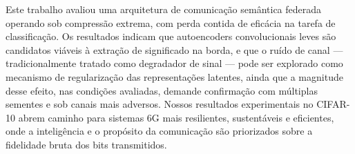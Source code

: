 \documentclass[conference,twocolumn]{IEEEtran}
\begin{document}
Este trabalho avaliou uma arquitetura de comunicação semântica federada operando sob compressão extrema, com perda contida de eficácia na tarefa de classificação. Os resultados indicam que autoencoders convolucionais leves são candidatos viáveis à extração de significado na borda, e que o ruído de canal --- tradicionalmente tratado como degradador de sinal --- pode ser explorado como mecanismo de regularização das representações latentes, ainda que a magnitude desse efeito, nas condições avaliadas, demande confirmação com múltiplas sementes e sob canais mais adversos. Nossos resultados experimentais no CIFAR-10 abrem caminho para sistemas 6G mais resilientes, sustentáveis e eficientes, onde a inteligência e o propósito da comunicação são priorizados sobre a fidelidade bruta dos bits transmitidos.



\end{document}
